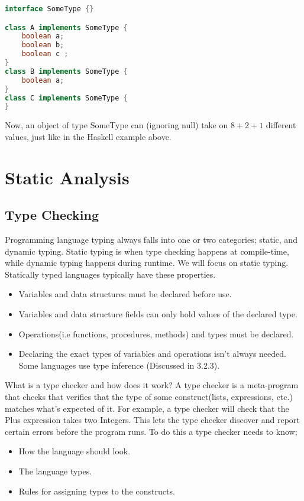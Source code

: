 \begin{itemize}
\begin{lstlisting}[language=Java]
interface SomeType {}

class A implements SomeType {
    boolean a;
    boolean b;
    boolean c ;
}
class B implements SomeType {
    boolean a;
}
class C implements SomeType {
}

\end{lstlisting}
    Now, an object of type SomeType can (ignoring null) take on $8 + 2 + 1$ different values,
    just like in the Haskell example above.


        \end{itemize}
    \section{Static Analysis}
        \subsection{Type Checking}
        Programming language typing always falls into one or two categories; static, and dynamic typing. Static typing is when type checking happens at compile-time, 
        while dynamic typing happens during runtime. We will focus on static typing. 
        Statically typed languages typically have these properties.
        \begin{itemize}
            \item Variables and data structures must be declared before use.
            \item Variables and data structure fields can only hold values of the declared type.
            \item Operations(i.e functions, procedures, methods) and types must be declared.
            \item Declaring the exact types of variables and operations isn't always needed. Some languages use type inference (Discussed in 3.2.3).
        \end{itemize}

        What is a type checker and how does it work? 
        A type checker is a meta-program that checks that verifies that the type of some construct(lists, expressions, etc.) matches what's expected of it.
        For example, a type checker will check that the Plus \gls{expression} takes two Integers. This lets the type checker discover and report certain errors before the program runs. 
        To do this a type checker needs to know;
        \begin{itemize}
            \item How the language should look.
            \item The language types.
            \item Rules for assigning types to the constructs.
        \end{itemize}
